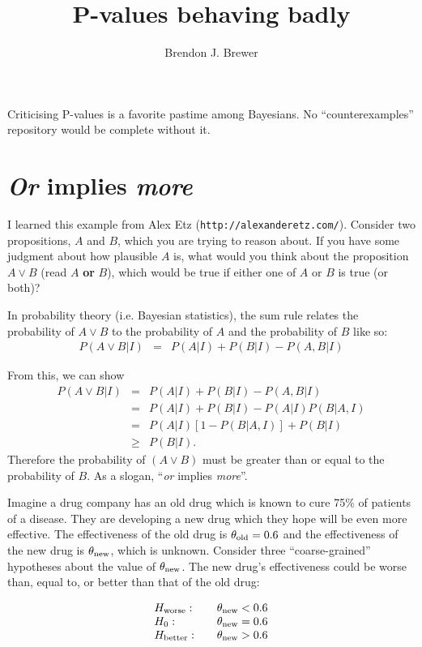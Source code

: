 \documentclass[a4paper, 12pt]{article}
\title{P-values behaving badly}
\author{Brendon J. Brewer}
\begin{document}
\maketitle

Criticising P-values is a favorite pastime among Bayesians. No
``counterexamples'' repository would be complete without it.

\section{{\em Or} implies {\em more}}
I learned this example from Alex Etz ({\tt http://alexanderetz.com/}).
Consider two propositions, $A$ and $B$, which you are trying to reason about.
If you have some judgment about how plausible $A$ is, what would you think
about the proposition $A \vee B$ (read $A$ {\bf or} $B$), which would be true
if either one of $A$ or $B$ is true (or both)? 

In probability theory (i.e. Bayesian statistics), the sum rule relates the
probability of $A \vee B$ to the probability of $A$ and the probability of
$B$ like so:
\begin{eqnarray}
P(A \vee B | I) &=& P(A | I) + P(B | I) - P(A, B | I)
\end{eqnarray}

From this, we can show
\begin{eqnarray}
P(A \vee B | I) &=& P(A | I) + P(B | I) - P(A, B | I)\\
                &=& P(A | I) + P(B | I) - P(A | I)P(B | A, I)\\
                &=& P(A | I)\left[1 - P(B | A,I)\right] + P(B | I)\\
                &\geq& P(B | I). 
\end{eqnarray}
Therefore the probability of $(A \vee B)$ must be greater than or equal to
the probability of $B$. As a slogan, ``{\em or} implies {\em more}''.


Imagine a drug company has an old drug which is known to cure
75\% of patients of a disease. They are developing a new drug
which they hope will be even more effective.
The effectiveness of the old drug is $\theta_{\rm old} = 0.6$ and the
effectiveness of the new drug is $\theta_{\rm new}$, which is unknown.
Consider three ``coarse-grained''
hypotheses about the value of $\theta_{\rm new}$. The new drug's
effectiveness could be worse than, equal to, or better than that of the old
drug:

\begin{equation}
\begin{array}{lcl}
H_{\rm worse}:  &  &\theta_{\rm new} < 0.6\\
H_0:            &  &\theta_{\rm new} = 0.6\\
H_{\rm better}: &  &\theta_{\rm new} > 0.6
\end{array}
\end{equation}
\end{document}
